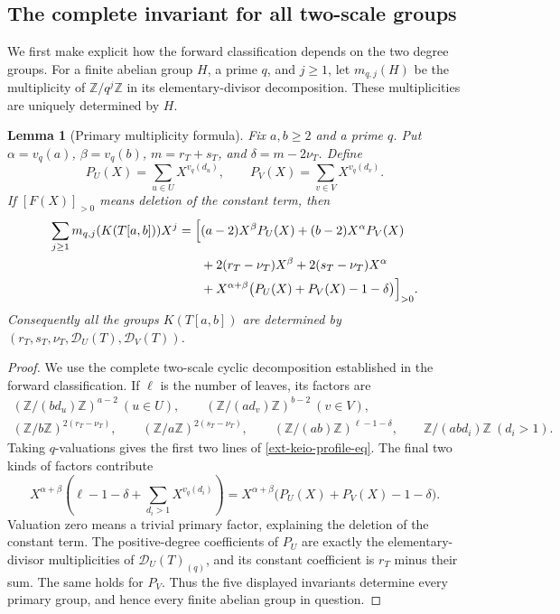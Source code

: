 \documentclass[11pt,a4paper]{article}
\newtheorem{lemma}[theorem]{Lemma}
\theoremstyle{definition}\newtheorem{definition}[theorem]{Definition}
\theoremstyle{remark}\newtheorem{remark}[theorem]{Remark}
\newcommand{\Z}{\mathbb Z}\newcommand{\Q}{\mathbb Q}\newcommand{\F}{\mathbb F}
\numberwithin{equation}{section}
\begin{document}
\subsection{The complete invariant for all two-scale groups}

We first make explicit how the forward classification depends on the two
degree groups.  For a finite abelian group $H$, a prime $q$, and $j\geq1$, let
$m_{q,j}(H)$ be the multiplicity of $\Z/q^j\Z$ in its elementary-divisor
decomposition.  These multiplicities are uniquely determined by $H$.

\begin{lemma}[Primary multiplicity formula]
\label{ext-keio-profile}
Fix $a,b\geq2$ and a prime $q$.  Put
$\alpha=v_q(a)$, $\beta=v_q(b)$, $m=r_T+s_T$, and
$\delta=m-2\nu_T$.  Define
\[
 P_U(X)=\sum_{u\in U}X^{v_q(d_u)},\qquad
 P_V(X)=\sum_{v\in V}X^{v_q(d_v)}.
\]
If $[F(X)]_{>0}$ means deletion of the constant term, then
\begin{align}
 \sum_{j\geq1}m_{q,j}(K(T[a,b]))X^j
 =\Bigl[{}&(a-2)X^\beta P_U(X)+(b-2)X^\alpha P_V(X)
       \notag\\
 &+2(r_T-\nu_T)X^\beta+2(s_T-\nu_T)X^\alpha
       \notag\\
 &+X^{\alpha+\beta}\bigl(P_U(X)+P_V(X)-1-\delta\bigr)
 \Bigr]_{>0}.                                             \label{ext-keio-profile-eq}
\end{align}
Consequently all the groups $K(T[a,b])$ are determined by
$(r_T,s_T,\nu_T,\mathcal D_U(T),\mathcal D_V(T))$.
\end{lemma}

\begin{proof}
We use the complete two-scale cyclic decomposition established in the forward
classification.  If $\ell$ is the number of leaves, its factors are
\[
 \begin{gathered}
 (\Z/(bd_u)\Z)^{a-2}\ (u\in U),\qquad
 (\Z/(ad_v)\Z)^{b-2}\ (v\in V),\\
 (\Z/b\Z)^{2(r_T-\nu_T)},\qquad
 (\Z/a\Z)^{2(s_T-\nu_T)},\qquad
 (\Z/(ab)\Z)^{\ell-1-\delta},\qquad
 \Z/(abd_i)\Z\ (d_i>1).
 \end{gathered}
\]
Taking $q$-valuations gives the first two lines of
\eqref{ext-keio-profile-eq}.  The final two kinds of factors contribute
\[
 X^{\alpha+\beta}
 \left(\ell-1-\delta+\sum_{d_i>1}X^{v_q(d_i)}\right)
 =X^{\alpha+\beta}\bigl(P_U(X)+P_V(X)-1-\delta\bigr).
\]
Valuation zero means a trivial primary factor, explaining the deletion of the
constant term.  The positive-degree coefficients of $P_U$ are exactly the
elementary-divisor multiplicities of $\mathcal D_U(T)_{(q)}$, and its constant
coefficient is $r_T$ minus their sum.  The same holds for $P_V$.  Thus the
five displayed invariants determine every primary group, and hence every
finite abelian group in question.
\end{proof}
\end{document}
